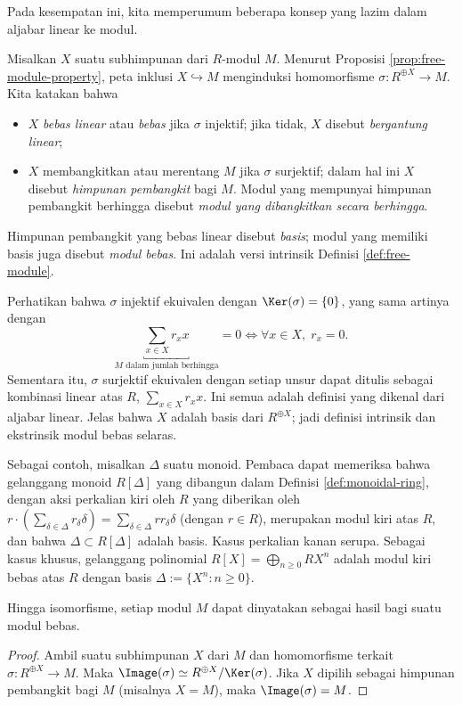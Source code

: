 Pada kesempatan ini, kita memperumum beberapa konsep yang lazim dalam aljabar linear ke modul.
\begin{definition}
	Misalkan $X$ suatu subhimpunan dari $R$-modul $M$. Menurut Proposisi \ref{prop:free-module-property}, peta inklusi $X \hookrightarrow M$ menginduksi homomorfisme $\sigma: R^{\oplus X} \to M$. Kita katakan bahwa
	\begin{itemize}
		\item $X$ \emph{bebas linear} atau \emph{bebas} jika $\sigma$ injektif; jika tidak, $X$ disebut \emph{bergantung linear};
		\item $X$ membangkitkan atau merentang $M$ jika $\sigma$ surjektif; dalam hal ini $X$ disebut \emph{himpunan pembangkit} bagi $M$. Modul yang mempunyai himpunan pembangkit berhingga disebut \emph{modul yang dibangkitkan secara berhingga}.
	\end{itemize}
	Himpunan pembangkit yang bebas linear disebut \emph{basis}; modul yang memiliki basis juga disebut \emph{modul bebas}. Ini adalah versi intrinsik Definisi \ref{def:free-module}.
\end{definition}
Perhatikan bahwa $\sigma$ injektif ekuivalen dengan $\Ker(\sigma)=\{0\}$, yang sama artinya dengan
\[ \underbracket{\sum_{x \in X} r_x x}_{M\text{ dalam jumlah berhingga}} = 0 \iff \forall x \in X, \; r_x = 0. \]
Sementara itu, $\sigma$ surjektif ekuivalen dengan setiap unsur dapat ditulis sebagai kombinasi linear atas $R$, $\sum_{x \in X} r_x x$. Ini semua adalah definisi yang dikenal dari aljabar linear. Jelas bahwa $X$ adalah basis dari $R^{\oplus X}$; jadi definisi intrinsik dan ekstrinsik modul bebas selaras.

Sebagai contoh, misalkan $\Delta$ suatu monoid. Pembaca dapat memeriksa bahwa gelanggang monoid $R[\Delta]$ yang dibangun dalam Definisi \ref{def:monoidal-ring}, dengan aksi perkalian kiri oleh $R$ yang diberikan oleh $r\cdot(\sum_{\delta \in \Delta} r_\delta \delta) = \sum_{\delta \in \Delta} rr_\delta \delta$ (dengan $r \in R$), merupakan modul kiri atas $R$, dan bahwa $\Delta \subset R[\Delta]$ adalah basis. Kasus perkalian kanan serupa. Sebagai kasus khusus, gelanggang polinomial $R[X] = \bigoplus_{n \geq 0 }RX^n$ adalah modul kiri bebas atas $R$ dengan basis $\Delta := \{ X^n: n \geq 0 \}$.

\begin{corollary}
	Hingga isomorfisme, setiap modul $M$ dapat dinyatakan sebagai hasil bagi suatu modul bebas.
\end{corollary}
\begin{proof}
	Ambil suatu subhimpunan $X$ dari $M$ dan homomorfisme terkait $\sigma: R^{\oplus X} \to M$. Maka $\Image(\sigma) \simeq R^{\oplus X}/\Ker(\sigma)$. Jika $X$ dipilih sebagai himpunan pembangkit bagi $M$ (misalnya $X=M$), maka $\Image(\sigma)=M$.
\end{proof}

